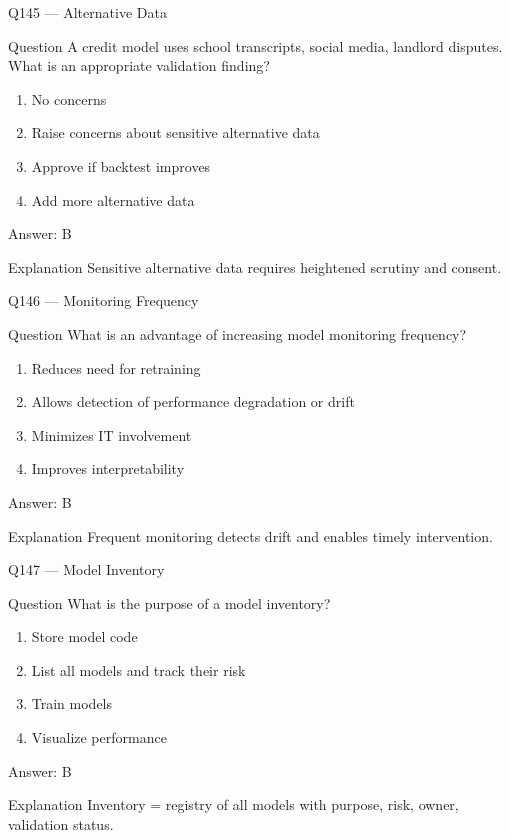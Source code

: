 \documentclass[aspectratio=169,8pt]{beamer}
\begin{document}
	\begin{frame}{Q145 --- Alternative Data}
		\begin{block}{Question}
			A credit model uses school transcripts, social media, landlord disputes. What is an appropriate validation finding?
		\end{block}
		\begin{enumerate}
			\item No concerns
			\item Raise concerns about sensitive alternative data
			\item Approve if backtest improves
			\item Add more alternative data
		\end{enumerate}
		\begin{exampleblock}{Answer: B}\end{exampleblock}
		\begin{block}{Explanation}
			Sensitive alternative data requires heightened scrutiny and consent.
		\end{block}
	\end{frame}
	
	\begin{frame}{Q146 --- Monitoring Frequency}
		\begin{block}{Question}
			What is an advantage of increasing model monitoring frequency?
		\end{block}
		\begin{enumerate}
			\item Reduces need for retraining
			\item Allows detection of performance degradation or drift
			\item Minimizes IT involvement
			\item Improves interpretability
		\end{enumerate}
		\begin{exampleblock}{Answer: B}\end{exampleblock}
		\begin{block}{Explanation}
			Frequent monitoring detects drift and enables timely intervention.
		\end{block}
	\end{frame}
	
	\begin{frame}{Q147 --- Model Inventory}
		\begin{block}{Question}
			What is the purpose of a model inventory?
		\end{block}
		\begin{enumerate}
			\item Store model code
			\item List all models and track their risk
			\item Train models
			\item Visualize performance
		\end{enumerate}
		\begin{exampleblock}{Answer: B}\end{exampleblock}
		\begin{block}{Explanation}
			Inventory = registry of all models with purpose, risk, owner, validation status.
		\end{block}
	\end{frame}
	
\end{document}
